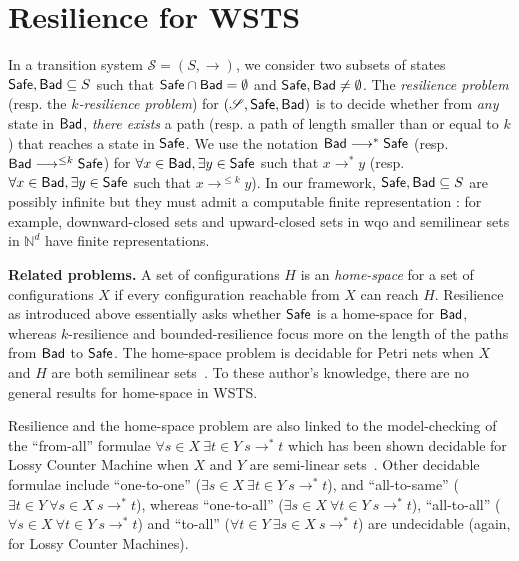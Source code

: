 
\section{Resilience for WSTS}


In a transition system $\mathscr{S}=(S,\rightarrow)$, we consider two subsets of states $\textsf{Safe}, \textsf{Bad} \subseteq S$ such that $\textsf{Safe} \cap  \textsf{Bad} = \emptyset$ and $\textsf{Safe} ,  \textsf{Bad} \neq \emptyset$.
The \emph{resilience problem} (resp. the \emph{$k$-resilience problem}) for $(\mathscr{S},\textsf{Safe},\textsf{Bad})$ is to decide whether from \emph{any} state in $\textsf{Bad}$, \emph{there exists} a path (resp. a path of length smaller than or equal to $k$) that reaches a state in $\textsf{Safe}$. We use the notation $\textsf{Bad} \longrightarrow^{*} \textsf{Safe}$ (resp. $\textsf{Bad} \longrightarrow^{\leq k} \textsf{Safe}$) for $\forall x \in \textsf{Bad}, \exists y \in \textsf{Safe}$ such that $x \longrightarrow^{*} y$ (resp.  $\forall x \in \textsf{Bad}, \exists y \in \textsf{Safe}$ such that $x \longrightarrow^{\leq k} y$). In our framework, $\textsf{Safe}, \textsf{Bad} \subseteq S$  are possibly infinite but they must admit a computable finite representation : for example, downward-closed sets and upward-closed sets in wqo and semilinear sets in $\mathbb{N}^d$ have finite representations. 



{\bf Related problems.} 
A set of configurations $H$ is an {\em home-space} for a set of configurations $X$ if every configuration reachable from $X$ can reach $H$. Resilience as introduced above essentially asks whether $\textsf{Safe}$ is a home-space for $\textsf{Bad}$, whereas $k$-resilience and bounded-resilience focus more on the length of the paths from $\textsf{Bad}$ to $\textsf{Safe}$. The home-space problem is decidable for
Petri nets when $X$ and $H$ are both semilinear sets~\cite{DBLP:journals/corr/abs-2207-02697}.
To these author's knowledge, there are no general results for home-space in WSTS.


Resilience and the home-space problem are also linked to the 
model-checking of the ``from-all'' formulae $\forall s \in X~ \exists t \in Y~ s \to^* t$
which has been shown decidable for Lossy Counter Machine
when $X$ and $Y$ are semi-linear sets~\cite{DBLP:conf/rp/Schnoebelen10}.
Other decidable formulae include ``one-to-one'' ($\exists s \in  X ~ \exists t \in  Y ~ s \to^* 
 t$), and ``all-to-same'' ($\exists t \in  Y ~ \forall s \in  X ~ s \to^*  t$),
whereas ``one-to-all'' ($\exists s \in  X ~ \forall t \in  Y ~ s \to^*  t$), 
``all-to-all'' ($\forall s \in  X ~ \forall t \in  Y ~ s \to^*  t$)
  and ``to-all'' ($\forall t \in  Y  ~ \exists s \in  X ~ s \to^*  t$) are undecidable (again, for Lossy Counter Machines). 
  

